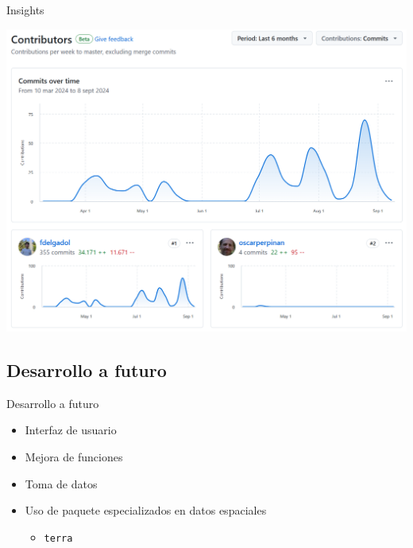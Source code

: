 \documentclass[aspectratio=169, usenames,svgnames,dvipsnames]{beamer}
\begin{document}
\begin{frame}[label={sec:orge8b69f8}]{Insights}
\begin{center}
\includegraphics[height=0.9\textheight]{../figuras/contributors.png}
\end{center}
\end{frame}
\subsection{Desarrollo a futuro}
\label{sec:org8fcb5d2}
\begin{frame}[label={sec:orgebd471d},fragile]{Desarrollo a futuro}
 \begin{itemize}
\item Interfaz de usuario

\item Mejora de funciones

\item Toma de datos

\item Uso de paquete especializados en datos espaciales
\begin{itemize}
\item \texttt{terra}
\end{itemize}
\end{itemize}
\end{frame}
\end{document}
